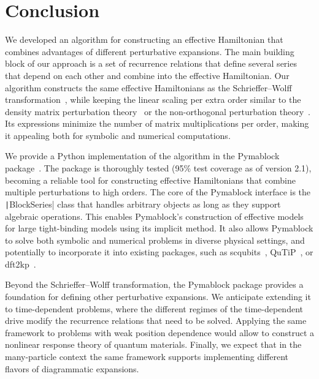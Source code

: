 \section{Conclusion}

We developed an algorithm for constructing an effective Hamiltonian that combines advantages of different perturbative expansions.
The main building block of our approach is a set of recurrence relations that define several series that depend on each other and combine into the effective Hamiltonian.
Our algorithm constructs the same effective Hamiltonians as the Schrieffer--Wolff transformation~\cite{Schrieffer_1966}, while keeping the linear scaling per extra order similar to the density matrix perturbation theory~\cite{McWeeny_1962, Truflandier_2020} or the non-orthogonal perturbation theory~\cite{Bloch_1958}.
Its expressions minimize the number of matrix multiplications per order, making it appealing both for symbolic and numerical computations.

We provide a Python implementation of the algorithm in the Pymablock package~\cite{Araya_2024}.
The package is thoroughly tested (95\% test coverage as of version 2.1), becoming a reliable tool for constructing effective Hamiltonians that combine multiple perturbations to high orders.
The core of the Pymablock interface is the \texttt|BlockSeries| class that handles arbitrary objects as long as they support algebraic operations.
This enables Pymablock's construction of effective models for large tight-binding models using its implicit method.
It also allows Pymablock to solve both symbolic and numerical problems in diverse physical settings, and potentially to incorporate it into existing packages, such as scqubits~\cite{Groszkowski_2021}, QuTiP~\cite{Johansson_2012,Johansson_2013}, or dft2kp~\cite{Cassiano_2024}.

Beyond the Schrieffer--Wolff transformation, the Pymablock package provides a foundation for defining other perturbative expansions.
We anticipate extending it to time-dependent problems, where the different regimes of the time-dependent drive modify the recurrence relations that need to be solved.
Applying the same framework to problems with weak position dependence would allow to construct a nonlinear response theory of quantum materials.
Finally, we expect that in the many-particle context the same framework supports implementing different flavors of diagrammatic expansions.
